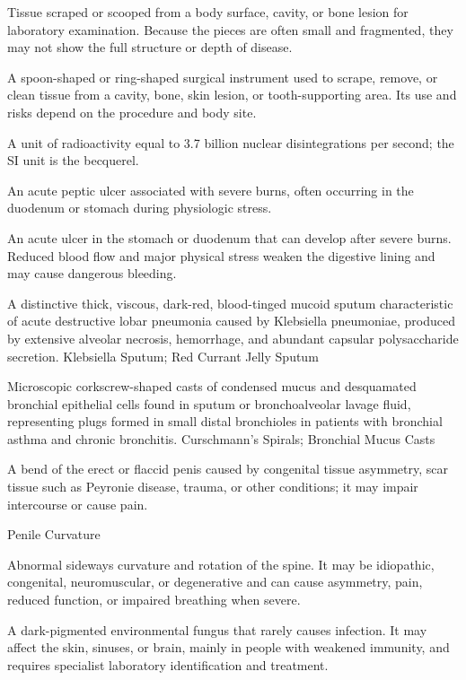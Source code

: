  Tissue scraped or scooped from a body surface, cavity, or bone lesion for laboratory examination. Because the pieces are often small and fragmented, they may not show the full structure or depth of disease.

 A spoon-shaped or ring-shaped surgical instrument used to scrape, remove, or clean tissue from a cavity, bone, skin lesion, or tooth-supporting area. Its use and risks depend on the procedure and body site.

 A unit of radioactivity equal to 3.7 billion nuclear disintegrations per second; the SI unit is the becquerel.

 An acute peptic ulcer associated with severe burns, often occurring in the duodenum or
stomach during physiologic stress.

 An acute ulcer in the stomach or duodenum that can develop after severe burns. Reduced blood flow and major physical stress weaken the digestive lining and may cause dangerous bleeding.

 A distinctive thick, viscous, dark-red, blood-tinged mucoid sputum characteristic of acute destructive lobar pneumonia caused by Klebsiella pneumoniae, produced by extensive alveolar necrosis, hemorrhage, and abundant capsular polysaccharide secretion.
\synonyms
Klebsiella Sputum; Red Currant Jelly Sputum

 Microscopic corkscrew-shaped casts of condensed mucus and desquamated bronchial epithelial cells found in sputum or bronchoalveolar lavage fluid, representing plugs formed in small distal bronchioles in patients with bronchial asthma and chronic bronchitis.
\synonyms
Curschmann's Spirals; Bronchial Mucus Casts

 A bend of the erect or flaccid penis caused by congenital tissue asymmetry, scar tissue such as Peyronie disease, trauma, or other conditions; it may impair intercourse or cause pain.

\synonyms
Penile Curvature

 Abnormal sideways curvature and rotation of the spine. It may be idiopathic, congenital, neuromuscular, or degenerative and can cause asymmetry, pain, reduced function, or impaired breathing when severe.

 A dark-pigmented environmental fungus that rarely causes infection. It may affect the skin, sinuses, or brain, mainly in people with weakened immunity, and requires specialist laboratory identification and treatment.

